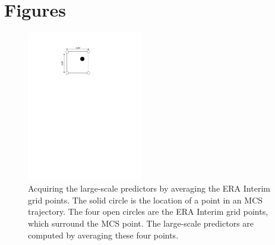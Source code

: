 \documentclass{article}
\begin{document}
\section{Figures}

\begin{figure}[h] %
\centering
\includegraphics[width=12pc]{figs/point.pdf}
\caption{Acquiring the large-scale predictors by averaging the ERA Interim grid points. The solid circle 
is the location of a point in an MCS trajectory. The four open circles are the ERA Interim grid points, 
which surround the MCS point. The large-scale predictors are computed by averaging these four points.}
\label{figone}
\end{figure}
\end{document}
